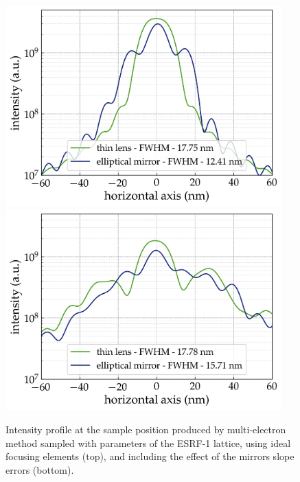 \documentclass{iucr}              %
\begin{document}
\begin{figure}
    \centering
        \includegraphics[width=0.95\textwidth]{GRAPHICS/ESRF_ideal.png}
        \includegraphics[width=0.95\textwidth]{GRAPHICS/ESRF_real.png}
    \label{fig:FiniteEmittanceA}
    \caption{
    Intensity profile at the sample position produced by multi-electron method sampled with parameters of the ESRF-1 lattice, using ideal focusing elements (top), and including the effect of the mirrors slope errors (bottom).
    }
\end{figure}
\end{document}
